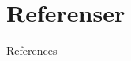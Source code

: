 \documentclass{beamer}
\begin{document}
\section{Referenser}

\begin{frame}{References}

\hyperlink{start}{}

\nocite{bibitem1}
\nocite{*}
 



\end{frame}
\end{document}
